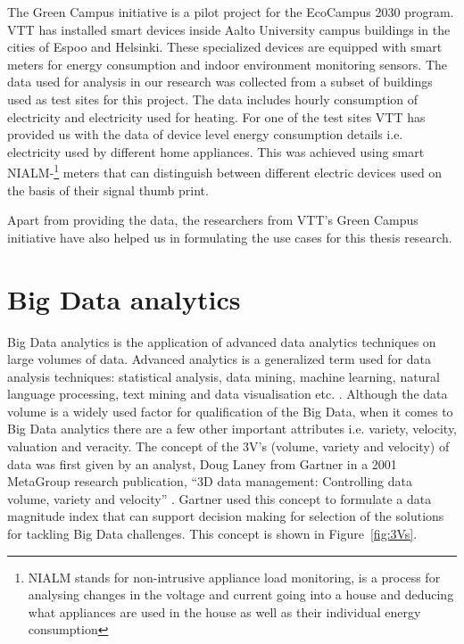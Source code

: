 The Green Campus initiative is a pilot project for the EcoCampus 2030 program. VTT has installed smart devices inside Aalto University campus buildings in the cities of Espoo and Helsinki. These specialized devices are equipped with smart meters for energy consumption and indoor environment monitoring sensors.  The data used for analysis in our research was collected from a subset of buildings used as test sites for this project. The data includes hourly consumption of electricity and electricity used for heating. For one of the test sites VTT has provided us with the data of device level energy consumption details i.e. electricity used by different home appliances. This was achieved using smart NIALM-\footnote{ NIALM stands for non-intrusive appliance load monitoring,  is a process for analysing changes in the voltage and current going into a house and deducing what appliances are used in the house as well as their individual energy consumption }\cite{ hart1992nonintrusive} meters that can distinguish between different electric devices used on the basis of their signal thumb print.

Apart from providing the data, the researchers from VTT's Green Campus initiative have also helped us in formulating the use cases for this thesis research.


\section{Big Data analytics} \label{big_data_analytics}

Big Data analytics is the application of advanced data analytics techniques on large volumes of data. Advanced analytics is a generalized term used for data analysis techniques: statistical analysis, data mining, machine learning, natural language processing, text mining and data visualisation etc. \cite{russom2011big}. Although the data volume is a widely used factor for qualification of the Big Data, when it comes to Big Data analytics there are a few other important attributes i.e. variety, velocity, valuation and veracity. The concept of the 3V's (volume, variety and velocity) of data was first given by an analyst, Doug Laney from Gartner  in a 2001 MetaGroup research publication, ``3D data management: Controlling data volume, variety and velocity'' \cite{laney20013d}.  Gartner used this concept to formulate a data magnitude index that can support decision making for selection of the solutions for tackling Big Data challenges. This concept is shown in Figure~\ref{fig:3Vs}.

